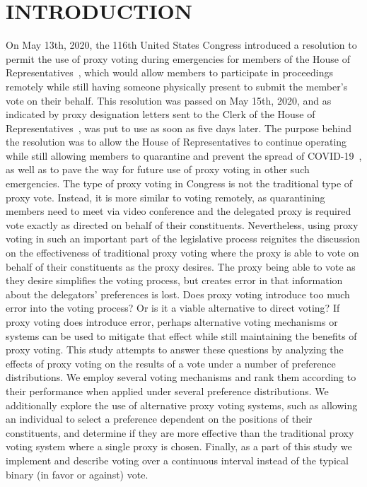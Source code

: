 %
%

\chapter{INTRODUCTION}\label{ch:introduction}
\thispagestyle{empty}
On May 13th, 2020, the 116th United States Congress introduced a resolution
to permit the use of proxy voting during emergencies for members of the House of
Representatives~\cite{Congress.gov2020}, which would allow members to participate in
proceedings remotely while still having someone physically present to submit the
member's vote on their behalf.
This resolution was passed on May 15th, 2020, and as indicated by proxy designation
letters sent to the Clerk of the House of Representatives~\cite{Clerk.House.gov2022},
was put to use as soon as five days later.
The purpose behind the resolution was to allow the House of Representatives
to continue operating while still allowing members to quarantine and prevent the
spread of COVID-19~\cite{Congress.gov2020}, as well as to pave the way for future use
of proxy voting in other such emergencies.
The type of proxy voting in Congress is not the traditional type of proxy vote.
Instead, it is more similar to voting remotely, as quarantining members need to
meet via video conference and the delegated proxy is required vote exactly as
directed on behalf of their constituents.
Nevertheless, using proxy voting in such an important part of the legislative process
reignites the discussion on the effectiveness of traditional proxy voting where the
proxy is able to vote on behalf of their constituents as the proxy desires.
The proxy being able to vote as they desire simplifies the voting process, but
creates error in that information about the delegators' preferences is lost.
Does proxy voting introduce too much error into the voting process?
Or is it a viable alternative to direct voting?
If proxy voting does introduce error, perhaps alternative voting mechanisms or systems
can be used to mitigate that effect while still maintaining the benefits of proxy
voting.
This study attempts to answer these questions by analyzing the effects of proxy
voting on the results of a vote under a number of preference distributions.
We employ several voting mechanisms and rank them according to their performance when
applied under several preference distributions.
We additionally explore the use of alternative proxy voting systems, such as
allowing an individual to select a preference dependent on the positions of their
constituents, and determine if they are more effective than the traditional proxy
voting system where a single proxy is chosen.
Finally, as a part of this study we implement and describe voting over a continuous
interval instead of the typical binary (in favor or against) vote.

